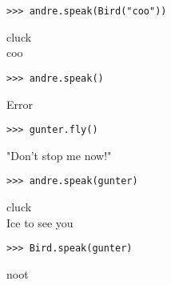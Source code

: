 \newpage
\begin{blocksection}
\vspace{9\baselineskip}
\begin{lstlisting}
>>> andre.speak(Bird("coo"))
\end{lstlisting}
\begin{solution}[.2in]
cluck \\
coo
\end{solution}

\vspace{3\baselineskip}
\begin{lstlisting}
>>> andre.speak()
\end{lstlisting}
\begin{solution}[.2in]
Error
\end{solution}

\vspace{3\baselineskip}
\begin{lstlisting}
>>> gunter.fly()
\end{lstlisting}
\begin{solution}[.2in]
"Don't stop me now!"
\end{solution}

\vspace{3\baselineskip}
\begin{lstlisting}
>>> andre.speak(gunter)
\end{lstlisting}
\begin{solution}[.2in]
cluck \\
Ice to see you
\end{solution}

\vspace{3\baselineskip}
\begin{lstlisting}
>>> Bird.speak(gunter)
\end{lstlisting}
\begin{solution}[.2in]
noot
\end{solution}
\end{blocksection}
\onecolumn

